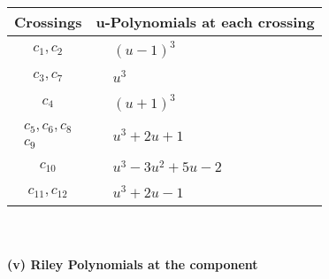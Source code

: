 \documentclass[1p]{elsarticle_modified}
\theoremstyle{definition}
\begin{document}
\begin{tabular}{m{50pt}|m{274pt}}
Crossings & \hspace{64pt}u-Polynomials at each crossing \\
\hline $$\begin{aligned}c_{1},c_{2}\end{aligned}$$&$\begin{aligned}
&(u-1)^3
\end{aligned}$\\
\hline $$\begin{aligned}c_{3},c_{7}\end{aligned}$$&$\begin{aligned}
&u^3
\end{aligned}$\\
\hline $$\begin{aligned}c_{4}\end{aligned}$$&$\begin{aligned}
&(u+1)^3
\end{aligned}$\\
\hline $$\begin{aligned}c_{5},c_{6},c_{8}\\c_{9}\end{aligned}$$&$\begin{aligned}
&u^3+2 u+1
\end{aligned}$\\
\hline $$\begin{aligned}c_{10}\end{aligned}$$&$\begin{aligned}
&u^3-3 u^2+5 u-2
\end{aligned}$\\
\hline $$\begin{aligned}c_{11},c_{12}\end{aligned}$$&$\begin{aligned}
&u^3+2 u-1
\end{aligned}$\\
\hline
\end{tabular}\\~\\
\newpage\renewcommand{\arraystretch}{1}
\flushleft \textbf{(v) Riley Polynomials at the component}\newline \\
\end{document}
